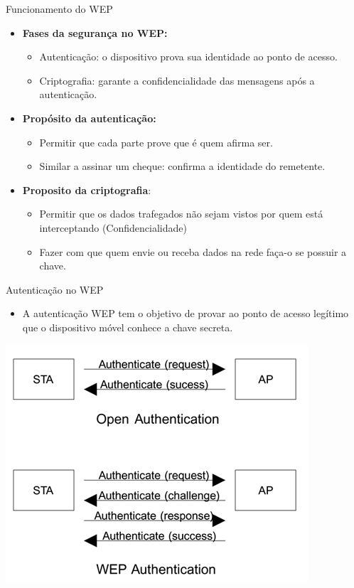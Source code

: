 \begin{frame}{Funcionamento do WEP}
\begin{itemize}
    \item \textbf{Fases da segurança no WEP:}
    \begin{itemize}
        \item Autenticação: o dispositivo prova sua identidade ao ponto de acesso.
        \item Criptografia: garante a confidencialidade das mensagens após a autenticação.
    \end{itemize}
\end{itemize}
\begin{itemize}
    \item \textbf{Propósito da autenticação:}
    \begin{itemize}
        \item Permitir que cada parte prove que é quem afirma ser.
        \item Similar a assinar um cheque: confirma a identidade do remetente.
    \end{itemize}
\end{itemize}

\begin{itemize}
    \item \textbf{Proposito da criptografia}:
        \begin{itemize}
            \item Permitir que os dados trafegados não sejam vistos por quem está interceptando (Confidencialidade)
            \item Fazer com que quem envie ou receba dados na rede faça-o se possuir a chave.
        \end{itemize}
\end{itemize}

    
\end{frame}





\begin{frame}{Autenticação no WEP}
\begin{itemize}
    \item A autenticação WEP tem o objetivo de provar ao ponto de acesso legítimo que o dispositivo móvel conhece a chave secreta.
\end{itemize}

\centering
  \includegraphics[width=0.55\linewidth]{Figuras/wep-auth.png}



\end{frame}




